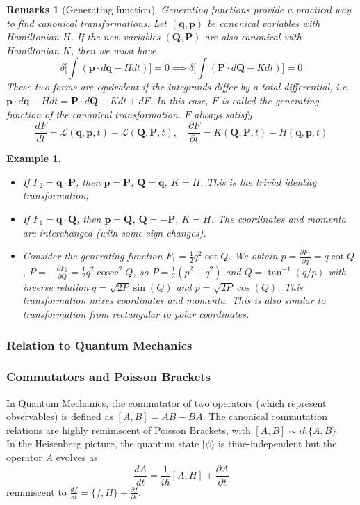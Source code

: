 \documentclass[a4paper]{article}
\DeclareMathOperator{\cosec}{cosec}
\newtheorem{remarks}{Remarks}[section]
\newtheorem{eg}{Example}[section]
\theoremstyle{new}
\begin{document}
\begin{remarks}[Generating function]
Generating functions provide a practical way to find canonical transformations. Let $(\mathbf{q},\mathbf{p})$ be canonical variables with Hamiltonian $H$. If the new variables $(\mathbf{Q},\mathbf{P})$ are also canonical with Hamiltonian $K$, then we must have
$$\delta\bigg[\int(\mathbf{p}\cdot d\mathbf{q}-Hdt)\bigg]=0\implies\delta\bigg[\int(\mathbf{P}\cdot d\mathbf{Q}-Kdt)\bigg]=0$$
These two forms are equivalent if the integrands differ by a total differential, i.e. $\mathbf{p}\cdot d\mathbf{q}-Hdt=\mathbf{P}\cdot d\mathbf{Q}-Kdt+dF$. In this case, $F$ is called the generating function of the canonical transformation. $F$ always satisfy
$$\frac{dF}{dt}=\mathcal{L}(\mathbf{q},\mathbf{p},t)-\mathcal{L}(\mathbf{Q},\mathbf{P},t),\quad\frac{\partial F}{\partial t}=K(\mathbf{Q},\mathbf{P},t)-H(\mathbf{q},\mathbf{p},t)$$
\end{remarks}
\begin{eg}\leavevmode
\begin{itemize}
    \item If $F_2=\mathbf{q}\cdot\mathbf{P}$, then $\mathbf{p}=\mathbf{P}$, $\mathbf{Q}=\mathbf{q}$, $K=H$. This is the trivial identity transformation;
    \item If $F_1=\mathbf{q}\cdot\mathbf{Q}$, then $\mathbf{p}=\mathbf{Q}$, $\mathbf{Q}=-\mathbf{P}$, $K=H$. The coordinates and momenta are interchanged (with some sign changes).
    \item Consider the generating function $F_1=\frac{1}{2}q^2\cot Q$. We obtain $p=\frac{\partial F_1}{\partial q}=q\cot Q$, $P=-\frac{\partial F_1}{\partial Q}=\frac{1}{2}q^2\cosec^2Q$, so $P=\frac{1}{2}(p^2+q^2)$ and $Q=\tan^{-1}(q/p)$ with inverse relation $q=\sqrt{2P}\sin(Q)$ and $p=\sqrt{2P}\cos(Q)$. This transformation mixes coordinates and momenta. This is also similar to transformation from rectangular to polar coordinates.
\end{itemize}
\end{eg}
\newpage
\subsubsection{Relation to Quantum Mechanics}
\subsubsection*{Commutators and Poisson Brackets}
In Quantum Mechanics, the commutator of two operators (which represent observables) is defined as $[A,B]=AB-BA$. The canonical commutation relations are highly reminiscent of Poisson Brackets, with $[A,B]\sim i\hbar\{A,B\}$.\\[5pt] 
In the Heisenberg picture, the quantum state $|\psi\rangle$ is time-independent but the operator $A$ evolves as
$$\frac{dA}{dt}=\frac{1}{i\hbar}[A,H]+\frac{\partial A}{\partial t}$$
reminiscent to $\frac{df}{dt}=\{f,H\}+\frac{\partial f}{\partial t}$.
\end{document}
